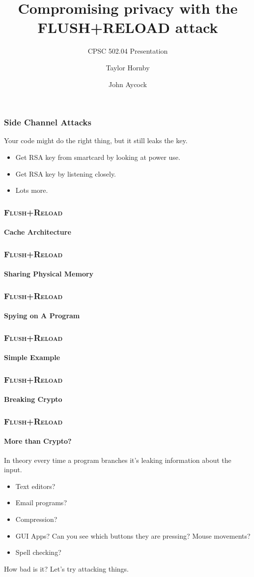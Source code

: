 \documentclass{beamer}
\title{Compromising privacy with the FLUSH+RELOAD attack}
\subtitle{CPSC 502.04 Presentation}
\author{Taylor Hornby \and John Aycock}
\begin{document}
    \frame{\titlepage}

\begin{frame}
    \frametitle{Side Channel Attacks}
    Your code might do the right thing, but it still leaks the key.
    \begin{itemize}
        \item Get RSA key from smartcard by looking at power use.
        \item Get RSA key by listening closely.
        \item Lots more.
    \end{itemize}
\end{frame}


\begin{frame}
    \frametitle{\textsc{Flush+Reload}}
    \framesubtitle{Cache Architecture}
\end{frame}

\begin{frame}
    \frametitle{\textsc{Flush+Reload}}
    \framesubtitle{Sharing Physical Memory}
\end{frame}

\begin{frame}
    \frametitle{\textsc{Flush+Reload}}
    \framesubtitle{Spying on A Program}
\end{frame}

\begin{frame}
    \frametitle{\textsc{Flush+Reload}}
    \framesubtitle{Simple Example}
\end{frame}

\begin{frame}
    \frametitle{\textsc{Flush+Reload}}
    \framesubtitle{Breaking Crypto}
\end{frame}

\begin{frame}
    \frametitle{\textsc{Flush+Reload}}
    \framesubtitle{More than Crypto?}

    In theory every time a program branches it's leaking information about the
    input.

    \begin{itemize}
        \item Text editors?
        \item Email programs?
        \item Compression?
        \item GUI Apps? Can you see which buttons they are pressing? Mouse movements?
        \item Spell checking?
    \end{itemize}

    How bad is it? Let's try attacking things.
\end{frame}
\end{document}
